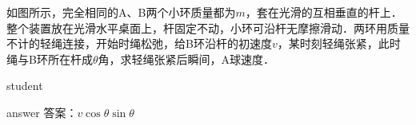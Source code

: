  \begin{example}
 	如图所示，完全相同的A、B两个小环质量都为$ m $，套在光滑的互相垂直的杆上．整个装置放在光滑水平桌面上，杆固定不动，小环可沿杆无摩擦滑动．两环用质量不计的轻绳连接，开始时绳松弛，给B环沿杆的初速度$ v $，某时刻轻绳张紧，此时绳与B环所在杆成$ \theta $角，求轻绳张紧后瞬间，A球速度．
 	
 	
 	\begin{taggedblock}{student}
 		\vspace*{2cm}
 	\end{taggedblock}
 	
 	
 	\begin{taggedblock}{answer}
 		答案：$ v\cos\theta\sin\theta $
 	\end{taggedblock}
 	

\end{example}
